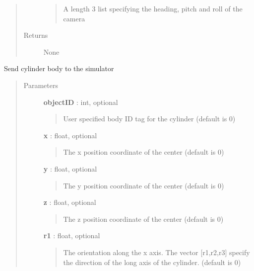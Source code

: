 \documentclass[letterpaper,10pt,english]{sphinxmanual}
\begin{document}
\begin{fulllineitems}
\begin{fulllineitems}
\begin{quote}
\begin{description}
\begin{quote}
A length 3 list specifying the heading, pitch and roll of the camera
\end{quote}

\item[{Returns}] \leavevmode
None

\end{description}\end{quote}

\end{fulllineitems}


\begin{fulllineitems}
\label{code:pyrosim.PYROSIM.Send_Cylinder}
Send cylinder body to the simulator
\begin{quote}\begin{description}
\item[{Parameters}] \leavevmode
\textbf{objectID} : int, optional
\begin{quote}

User specified body ID tag for the cylinder (default is 0)
\end{quote}

\textbf{x} : float, optional
\begin{quote}

The x position coordinate of the center (default is 0)
\end{quote}

\textbf{y} : float, optional
\begin{quote}

The y position coordinate of the center (default is 0)
\end{quote}

\textbf{z} : float, optional
\begin{quote}

The z position coordinate of the center (default is 0)
\end{quote}

\textbf{r1} : float, optional
\begin{quote}

The orientation along the x axis. The vector {[}r1,r2,r3{]}
specify the direction of the long axis of the cylinder.
(default is 0)
\end{quote}


\end{description}
\end{quote}
\end{fulllineitems}
\end{fulllineitems}
\end{document}

